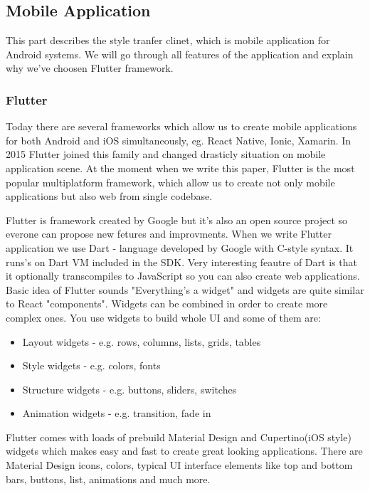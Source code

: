\documentclass[../Main.tex]{subfiles}
\begin{document}
\newpage
\subsection{Mobile Application}
    This part describes the style tranfer clinet, which is mobile application 
    for Android systems. We will go through all features of the application and
    explain why we've choosen Flutter framework. 
    \subsubsection{Flutter}
        Today there are several frameworks which allow us to create mobile 
        applications for both Android and iOS simultaneously, 
        eg. React Native, Ionic, Xamarin.
        In 2015 Flutter joined this family and changed drasticly situation
        on mobile application scene. At the moment when we write this paper,
        Flutter is the most popular multiplatform framework, which allow us to 
        create not only mobile applications but also web from single codebase.
    
        Flutter is framework created by Google but it's also an open source project 
        so everone can propose new fetures and improvments. 
        When we write Flutter application we use Dart - language developed by 
        Google with C-style syntax.
        It runs's on Dart VM included in the SDK. 
        Very interesting feautre of Dart is that it optionally transcompiles to 
        JavaScript so you can also create web applications.
        Basic idea of Flutter sounds "Everything’s a widget" and widgets are 
        quite similar to React "components". 
        Widgets can be combined in order to create more complex ones. 
        You use widgets to build whole UI and some of them are:
        \begin{itemize}
            \item Layout widgets - e.g. rows, columns, lists, grids, tables
            \item Style widgets - e.g. colors, fonts
            \item Structure widgets - e.g. buttons, sliders, switches
            \item Animation widgets - e.g. transition, fade in
        \end{itemize}
        Flutter comes with loads of prebuild Material Design and Cupertino(iOS style)
        widgets which makes easy and fast to create great looking applications. 
        There are Material Design icons, colors, typical UI interface 
        elements like top and bottom bars, buttons, list, animations and much more.
        
\end{document}

